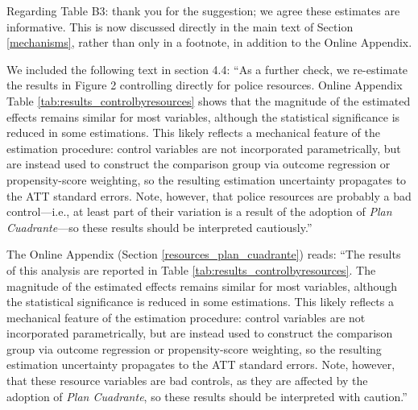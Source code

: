 Regarding Table B3: thank you for the suggestion; we agree these estimates are informative. This is now discussed directly in the main text of Section \ref{mechanisms}, rather than only in a footnote, in addition to the Online Appendix. 

We included the following text in section 4.4: ``As a further check, we re-estimate the results in Figure 2 controlling directly for police resources. Online Appendix Table \ref{tab:results_controlbyresources} shows that the magnitude of the estimated effects remains similar for most variables, although the statistical significance is reduced in some estimations. This likely reflects a mechanical feature of the \citet{Callaway} estimation procedure: control variables are not incorporated parametrically, but are instead used to construct the comparison group via outcome regression or propensity-score weighting, so the resulting estimation uncertainty propagates to the ATT standard errors. Note, however, that police resources are probably a bad control---i.e., at least part of their variation is a result of the adoption of \emph{Plan Cuadrante}---so these results should be interpreted cautiously.'' 


The Online Appendix (Section \ref{resources_plan_cuadrante}) reads: ``The results of this analysis are reported in Table \ref{tab:results_controlbyresources}. The magnitude of the estimated effects remains similar for most variables, although the statistical significance is reduced in some estimations. This likely reflects a mechanical feature of the \citet{Callaway} estimation procedure: control variables are not incorporated parametrically, but are instead used to construct the comparison group via outcome regression or propensity-score weighting, so the resulting estimation uncertainty propagates to the ATT standard errors. Note, however, that these resource variables are bad controls, as they are affected by the adoption of \emph{Plan Cuadrante}, so these results should be interpreted with caution.''

